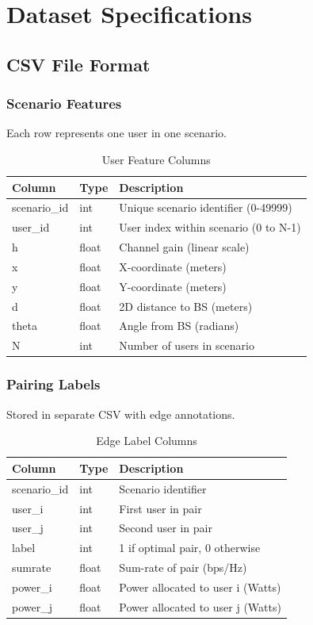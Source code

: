 \chapter{Dataset Specifications}
\label{app:dataset}

\section{CSV File Format}

\subsection{Scenario Features}
Each row represents one user in one scenario.

\begin{table}[H]
\centering
\begin{tabular}{lll}
\toprule
\textbf{Column} & \textbf{Type} & \textbf{Description} \\
\midrule
scenario\_id & int & Unique scenario identifier (0-49999) \\
user\_id & int & User index within scenario (0 to N-1) \\
h & float & Channel gain (linear scale) \\
x & float & X-coordinate (meters) \\
y & float & Y-coordinate (meters) \\
d & float & 2D distance to BS (meters) \\
theta & float & Angle from BS (radians) \\
N & int & Number of users in scenario \\
\bottomrule
\end{tabular}
\caption{User Feature Columns}
\end{table}

\subsection{Pairing Labels}
Stored in separate CSV with edge annotations.

\begin{table}[H]
\centering
\begin{tabular}{lll}
\toprule
\textbf{Column} & \textbf{Type} & \textbf{Description} \\
\midrule
scenario\_id & int & Scenario identifier \\
user\_i & int & First user in pair \\
user\_j & int & Second user in pair \\
label & int & 1 if optimal pair, 0 otherwise \\
sumrate & float & Sum-rate of pair (bps/Hz) \\
power\_i & float & Power allocated to user i (Watts) \\
power\_j & float & Power allocated to user j (Watts) \\
\bottomrule
\end{tabular}
\caption{Edge Label Columns}
\end{table}

